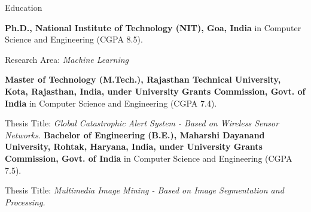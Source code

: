 \begin{rubric}{Education}

	\entry*[2021 -- Present]%
		\textbf{Ph.D., National Institute of Technology (NIT), Goa, India} in Computer Science and Engineering (CGPA 8.5).
		\par Research Area: \emph{Machine Learning}
		
	\entry*[2009 -- 2011]%
		\textbf{Master of Technology (M.Tech.), Rajasthan Technical University, Kota, Rajasthan, India, under University Grants Commission, Govt. of India} in Computer Science and Engineering (CGPA 7.4).
		\par Thesis Title: \emph{Global Catastrophic Alert System - Based on Wireless Sensor Networks.}
	\entry*[2005 -- 2009]%
		\textbf{Bachelor of Engineering (B.E.), Maharshi Dayanand University, Rohtak, Haryana, India, under University Grants Commission, Govt. of India} in Computer Science and Engineering (CGPA 7.5).\par
		Thesis Title: \emph{Multimedia Image Mining - Based on Image Segmentation and Processing.}
	\end{rubric}